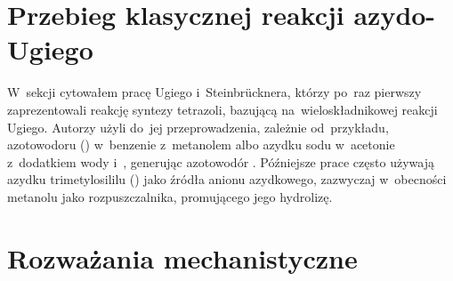\section{Przebieg klasycznej reakcji azydo-Ugiego}\label{numeric:classical}
W~sekcji  cytowałem pracę Ugiego i~Steinbr{\"u}cknera,
  którzy po~raz pierwszy zaprezentowali reakcję syntezy tetrazoli, bazującą
  na~wieloskładnikowej reakcji Ugiego.
Autorzy użyli do~jej przeprowadzenia, zależnie od~przykładu, azotowodoru () w~benzenie
  z~metanolem albo azydku sodu w~acetonie z~dodatkiem wody i~, generując azotowodór \insitu.
Późniejsze prace często używają azydku trimetylosililu () jako źródła
  anionu azydkowego, zazwyczaj w~obecności metanolu jako rozpuszczalnika,
  promującego jego hydrolizę.


\section{Rozważania mechanistyczne}\label{numeric:mechanism}

